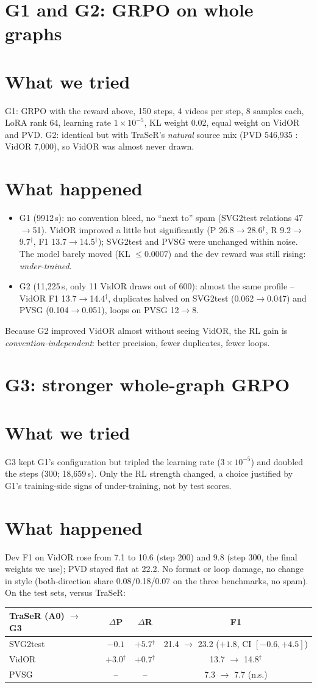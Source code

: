 \documentclass[11pt,openany]{book}
\newcommand{\sig}{\ensuremath{^\dagger}}
\newcommand{\tsec}{\section*{What we tried}}
\newcommand{\hsec}{\section*{What happened}}
\begin{document}
\section{G1 and G2: GRPO on whole graphs}
\tsec
G1: GRPO with the reward above, 150 steps, 4 videos per step, 8 samples each, LoRA rank 64, learning rate $1\times10^{-5}$, KL
weight 0.02, equal weight on VidOR and PVD. G2: identical but with TraSeR's \emph{natural} source mix (PVD 546,935 : VidOR 7,000),
so VidOR was almost never drawn.

\hsec
\begin{itemize}
  \item G1 (9912\,s): no convention bleed, no ``next to'' spam (SVG2test relations 47$\to$51). VidOR improved a little but
  significantly (P 26.8$\to$28.6\sig, R 9.2$\to$9.7\sig, F1 13.7$\to$14.5\sig); SVG2test and PVSG were unchanged within noise. The
  model barely moved (KL $\le 0.0007$) and the dev reward was still rising: \emph{under-trained}.
  \item G2 (11,225\,s, only 11 VidOR draws out of 600): almost the same profile -- VidOR F1 13.7$\to$14.4\sig, duplicates halved
  on SVG2test (0.062$\to$0.047) and PVSG (0.104$\to$0.051), loops on PVSG 12$\to$8.
\end{itemize}
Because G2 improved VidOR almost without seeing VidOR, the RL gain is \emph{convention-independent}: better precision, fewer
duplicates, fewer loops.

\section{G3: stronger whole-graph GRPO}
\tsec
G3 kept G1's configuration but tripled the learning rate ($3\times10^{-5}$) and doubled the steps (300; 18,659\,s). Only the RL
strength changed, a choice justified by G1's training-side signs of under-training, not by test scores.

\hsec
Dev F1 on VidOR rose from 7.1 to 10.6 (step 200) and 9.8 (step 300, the final weights we use); PVD stayed flat at 22.2. No format or
loop damage, no change in style (both-direction share 0.08/0.18/0.07 on the three benchmarks, no spam). On the test sets, versus
TraSeR:
\begin{center}
\begin{tabular}{@{}lccc@{}}
\toprule
TraSeR (A0) $\to$ G3 & $\Delta$P & $\Delta$R & F1 \\
\midrule
SVG2test & $-0.1$ & $+5.7$\sig & 21.4 $\to$ 23.2 \; ($+1.8$, CI $[-0.6,+4.5]$) \\
VidOR & $+3.0$\sig & $+0.7$\sig & 13.7 $\to$ 14.8\sig \\
PVSG & -- & -- & 7.3 $\to$ 7.7 (n.s.) \\
\bottomrule
\end{tabular}
\end{center}
\end{document}

